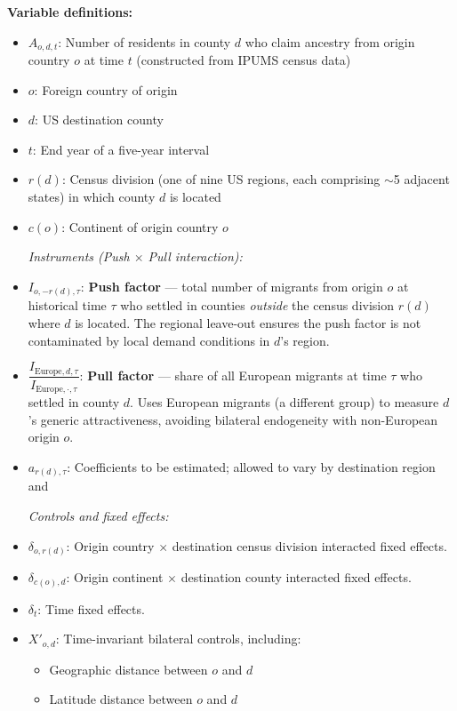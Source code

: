 \noindent\textbf{Variable definitions:}
\begin{itemize}
    \item $A_{o,d,t}$: Number of residents in county $d$ who claim ancestry from origin country $o$ at time $t$ (constructed from IPUMS census data)
    \item $o$: Foreign country of origin
    \item $d$: US destination county
    \item $t$: End year of a five-year interval
    \item $r(d)$: Census division (one of nine US regions, each comprising $\sim$5 adjacent states) in which county $d$ is located
    \item $c(o)$: Continent of origin country $o$
    
    \bigskip
    \textit{Instruments (Push $\times$ Pull interaction):}
    \item $I_{o,-r(d),\tau}$: \textbf{Push factor} --- total number of migrants from origin $o$ at historical time $\tau$ who settled in counties \emph{outside} the census division $r(d)$ where $d$ is located. The regional leave-out ensures the push factor is not contaminated by local demand conditions in $d$'s region.
    \item $\dfrac{I_{\text{Europe},d,\tau}}{I_{\text{Europe},\cdot,\tau}}$: \textbf{Pull factor} --- share of all European migrants at time $\tau$ who settled in county $d$. Uses European migrants (a different group) to measure $d$'s generic attractiveness, avoiding bilateral endogeneity with non-European origin $o$.
    \item $a_{r(d),\tau}$: Coefficients to be estimated; allowed to vary by destination region and 
    
    \bigskip
    \textit{Controls and fixed effects:}
    \item $\delta_{o,r(d)}$: Origin country $\times$ destination census division interacted fixed effects.
    \item $\delta_{c(o),d}$: Origin continent $\times$ destination county interacted fixed effects. 
    \item $\delta_t$: Time fixed effects.
    \item $X'_{o,d}$: Time-invariant bilateral controls, including:
        \begin{itemize}
            \item Geographic distance between $o$ and $d$
            \item Latitude distance between $o$ and $d$
        \end{itemize}
\end{itemize}

